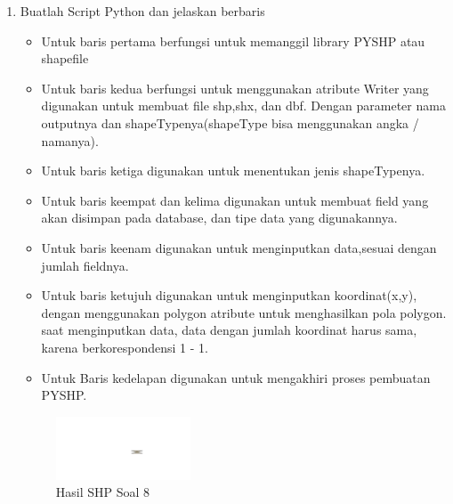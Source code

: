 \begin{enumerate}
	\item Buatlah Script Python dan jelaskan berbaris
	
	\begin{itemize}
		\item Untuk baris pertama berfungsi untuk memanggil library PYSHP atau shapefile
		\item Untuk baris kedua berfungsi untuk menggunakan atribute Writer yang digunakan untuk membuat file shp,shx, dan dbf. \hfill\break Dengan parameter nama outputnya dan shapeTypenya(shapeType bisa menggunakan angka / namanya).
		\item Untuk baris ketiga digunakan untuk menentukan jenis shapeTypenya.
		\item Untuk baris keempat dan kelima digunakan untuk membuat field yang akan disimpan pada database, dan tipe data yang digunakannya.
		\item Untuk baris keenam digunakan untuk menginputkan data,sesuai dengan jumlah fieldnya.
		\item Untuk baris ketujuh digunakan untuk menginputkan koordinat(x,y), dengan menggunakan polygon atribute untuk menghasilkan pola polygon. \hfill\break
		saat menginputkan data, data dengan jumlah koordinat harus sama, karena berkorespondensi 1 - 1.
		\item Untuk Baris kedelapan digunakan untuk mengakhiri proses pembuatan PYSHP.
	\end{itemize}
	\hfill\break
	\begin{figure}[H]
		\includegraphics[width=4cm]{figures/1174095/2/8.png}
		\centering
		\caption{Hasil SHP Soal 8}
	\end{figure}


\end{enumerate}
